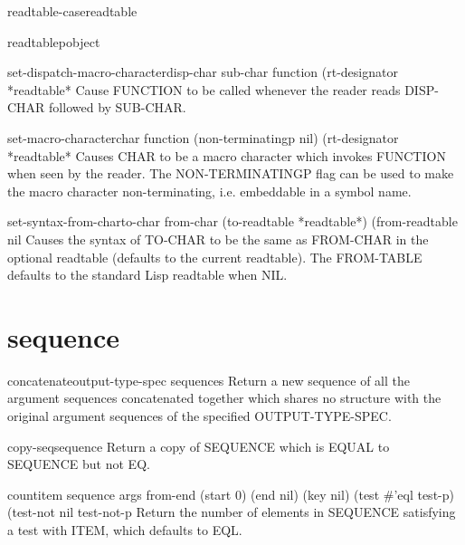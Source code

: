 \begin{accessor}{readtable-case}{readtable}{}
  
\end{accessor}

\begin{function}{readtablep}{object}{}
  
\end{function}

\begin{function}{set-dispatch-macro-character}{disp-char sub-char function \op (rt-designator *readtable*}{}
  Cause FUNCTION to be called whenever the reader reads DISP-CHAR
   followed by SUB-CHAR.
\end{function}

\begin{function}{set-macro-character}{char function \op (non-terminatingp nil) (rt-designator *readtable*}{}
  Causes CHAR to be a macro character which invokes FUNCTION when seen
   by the reader. The NON-TERMINATINGP flag can be used to make the macro
   character non-terminating, i.e. embeddable in a symbol name.
\end{function}

\begin{function}{set-syntax-from-char}{to-char from-char \op (to-readtable *readtable*) (from-readtable nil}{}
  Causes the syntax of TO-CHAR to be the same as FROM-CHAR in the optional
readtable (defaults to the current readtable). The FROM-TABLE defaults to the
standard Lisp readtable when NIL.
\end{function}

\section{sequence}

\begin{function}{concatenate}{output-type-spec \rest sequences}{}
  Return a new sequence of all the argument sequences concatenated together
  which shares no structure with the original argument sequences of the
  specified OUTPUT-TYPE-SPEC.
\end{function}

\begin{function}{copy-seq}{sequence}{}
  Return a copy of SEQUENCE which is EQUAL to SEQUENCE but not EQ.
\end{function}

\begin{function}{count}{item sequence \rest args \key from-end (start 0) (end nil) (key nil)
 (test #'eql test-p) (test-not nil test-not-p}{}
  Return the number of elements in SEQUENCE satisfying a test with ITEM,
   which defaults to EQL.
\end{function}

